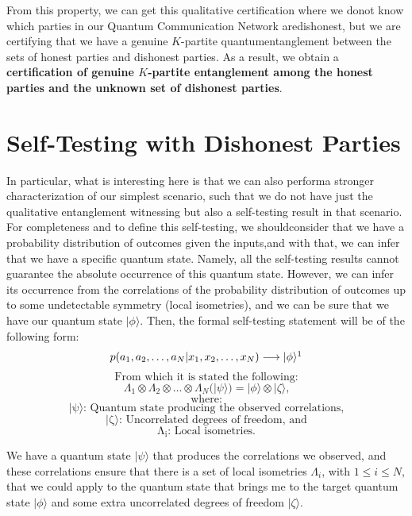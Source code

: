\documentclass[12pt]{article}
\begin{document}
    \noindent From this property, we can get this qualitative certification where we do\break not know which parties in our Quantum Communication Network are\break dishonest, but we are certifying that we have a genuine $K$-partite quantum\break entanglement between the sets of honest parties and dishonest parties. As a result, we obtain a \textbf{certification of \color{Red}genuine $K$-partite entanglement \color{Black} among the honest parties and the unknown set of dishonest parties}.
    
    
    \section{Self-Testing with Dishonest Parties}
    \label{sec:self-testing-with-dishonest-parties}

    In particular, what is interesting here is that we can also perform\break a stronger characterization of our simplest scenario, such that we do not have just the qualitative entanglement witnessing but also a self-testing result in that scenario. For completeness and to define this self-testing, we should\break consider that we have a probability distribution of outcomes given the inputs,\break and with that, we can infer that we have a specific quantum state. Namely, all the self-testing results cannot guarantee the absolute occurrence of this quantum state. However, we can infer its occurrence from the correlations of the probability distribution of outcomes up to some undetectable symmetry (local isometries), and we can be sure that we have our quantum state $|\phi\rangle$. Then, the formal self-testing statement will be of the following form:
    $$ p({a}_{1}, {a}_{2}, \dots, {a}_{N}|{x}_{1}, {x}_{2}, \dots, {x}_{N}) \longrightarrow |\phi\rangle\footnotemark $$
    $$ \mathrm{\text{From which it is stated the following:}} $$
    $$ {\Lambda}_{1} \otimes {\Lambda}_{2} \otimes \dots \otimes {\Lambda}_{N} (|\psi\rangle) = |\phi\rangle \otimes |\zeta\rangle \mathrm{\text{,}} $$
    $$ \mathrm{\text{where:}} $$
    $$ \mathrm{\text{$|\psi\rangle$: Quantum state producing the observed correlations,}} $$
    $$ \mathrm{\text{$|\zeta\rangle$: Uncorrelated degrees of freedom, and}} $$
    $$ \mathrm{\text{${\Lambda}_{i}$: Local isometries.}} $$
    
    \noindent We have a quantum state $|\psi\rangle$ that produces the correlations we observed, and these correlations ensure that there is a set of local isometries ${\Lambda}_{i}$, with $1 \leq i \leq N$, that we could apply to the quantum state that brings me to the target quantum state $|\phi\rangle$ and some extra uncorrelated degrees of freedom $|\zeta\rangle$.
\end{document}
